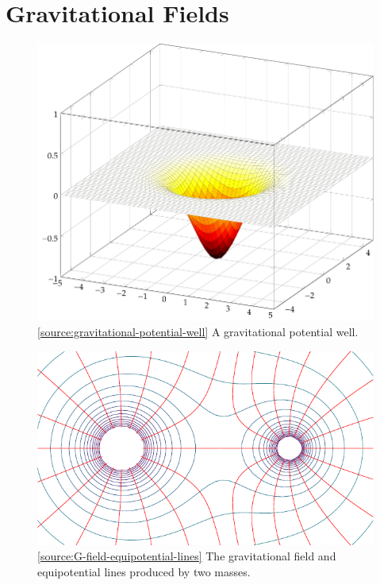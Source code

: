 \chapter{Gravitational Fields}
\begin{figure}[H]
    \centering
    \includegraphics{../images/gravitational-potential-well/gravitational-potential-well-illustration.pdf}
    \caption{\ref{source:gravitational-potential-well} A gravitational potential well.}
    \label{fig:gravitational-potential-well}
\end{figure}
\begin{figure}[H]
    \centering
    \includegraphics[scale=1.1]{../images/Gravitational-fields-illustration.pdf}
    \caption{\ref{source:G-field-equipotential-lines} The gravitational field and equipotential lines produced by two masses.}
    \label{fig:G-field-equipotential-lines}
\end{figure}
